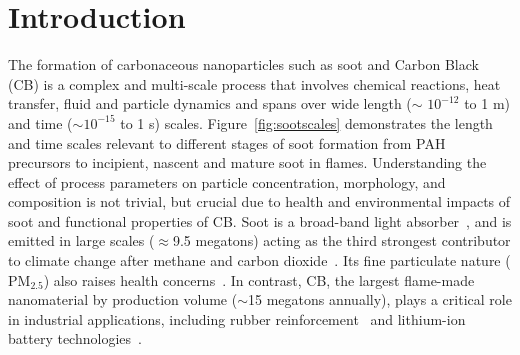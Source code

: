 \section{Introduction}
The formation of carbonaceous nanoparticles such as soot and Carbon Black (CB) is a complex and multi-scale process that involves chemical reactions, heat transfer, fluid and particle dynamics and spans over wide length ($\sim$ $10^{-12}$ to 1 m) and time ($\sim$$10^{-15}$ to 1 s) scales. Figure~\ref{fig:sootscales} demonstrates the length and time scales relevant to different stages of soot formation from PAH precursors to incipient, nascent and mature soot in flames. Understanding the effect of process parameters on particle concentration, morphology, and composition is not trivial, but crucial due to health and environmental impacts of soot and functional properties of CB.
Soot is a broad-band light absorber~\cite{d2009combustion}, and is emitted in large scales ($\approx$9.5 megatons) acting as the third strongest contributor to climate change after methane and carbon dioxide~\citep{myhre2014anthropogenic}. Its fine particulate nature ($\mathrm{PM_{2.5}}$) also raises health concerns~\citep{borm2004inhaled}. In contrast, CB, the largest flame-made nanomaterial by production volume ($\sim$15 megatons annually), plays a critical role in industrial applications, including rubber reinforcement~\citep{international2016carbon} and lithium-ion battery technologies~\citep{Palomares2010}.


